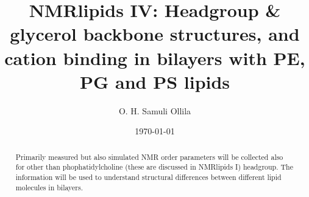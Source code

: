 \documentclass[aps,prl,superscriptaddress,twocolumn]{revtex4}
\begin{document}

\title{NMRlipids IV: Headgroup \& glycerol backbone structures, and cation binding in bilayers with PE, PG and PS lipids} %



\author{O. H. Samuli Ollila}



\date{\today}

\begin{abstract}
  Primarily measured but also simulated NMR order parameters will be collected also for other than phophatidylcholine
  (these are discussed in NMRlipids I) headgroup. The information will be used to understand structural differences between 
  different lipid molecules in bilayers.
\end{abstract}


\maketitle %

\end{document}
